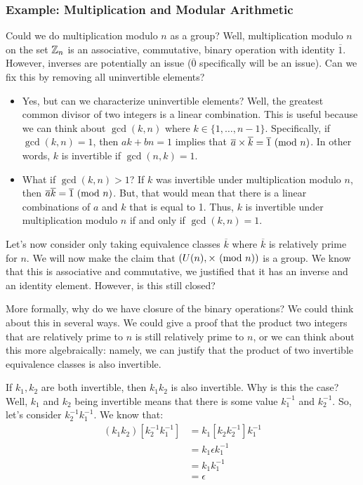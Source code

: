 \documentclass[letterpaper]{article}
\begin{document}
\subsubsection{Example: Multiplication and Modular Arithmetic}
Could we do multiplication modulo $n$ as a group? Well, multiplication modulo $n$ on the set $\mathbb{Z}_n$ is an associative, commutative, binary operation with identity $\overline{1}$. However, inverses are potentially an issue ($\overline{0}$ specifically will be an issue). Can we fix this by removing all uninvertible elements? 
\begin{itemize}
    \item Yes, but can we characterize uninvertible elements? Well, the greatest common divisor of two integers is a linear combination. This is useful because we can think about $\gcd(k, n)$ where $k \in \{1, \dots, n - 1\}$. Specifically, if $\gcd(k, n) = 1$, then $ak + bn = 1$ implies that $\overline{a} \times \overline{k} = \overline{1} \ (\mathrm{mod}\ n)$. In other words, $k$ is invertible if $\gcd(n, k) = 1$. 
    \item What if $\gcd(k, n) > 1$? If $k$ was invertible under multiplication modulo $n$, then $\overline{a} \overline{k} = \overline{1} \ (\mathrm{mod}\ n)$. But, that would mean that there is a linear combinations of $a$ and $k$ that is equal to 1. Thus, $k$ is invertible under multiplication modulo $n$ if and only if $\gcd(k, n) = 1$. 
\end{itemize}
Let's now consider only taking equivalence classes $\overline{k}$ where $\overline{k}$ is relatively prime for $n$. We will now make the claim that $(U(n), \times \ (\mathrm{mod}\ n))$ is a group. We know that this is associative and commutative, we justified that it has an inverse and an identity element. However, is this still closed? 

\bigskip 

More formally, why do we have closure of the binary operations? We could think about this in several ways. We could give a proof that the product two integers that are relatively prime to $n$ is still relatively prime to $n$, or we can think about this more algebraically: namely, we can justify that the product of two invertible equivalence classes is also invertible. 

\bigskip 

If $k_1, k_2$ are both invertible, then $k_1 k_2$ is also invertible. Why is this the case? Well, $k_1$ and $k_2$ being invertible means that there is some value $k_1^{-1}$ and $k_2^{-1}$. So, let's consider $k_2^{-1} k_1^{-1}$. We know that:
\begin{equation*}
    \begin{aligned}
        (k_1 k_2) \left[k_2^{-1} k_1^{-1}\right] &= k_1 \left[k_2 k_2^{-1}\right] k_1^{-1} \\ 
            &= k_1 \epsilon k_1^{-1} \\ 
            &= k_1 k_1^{-1} \\ 
            &= \epsilon
    \end{aligned}
\end{equation*}
\end{document}
